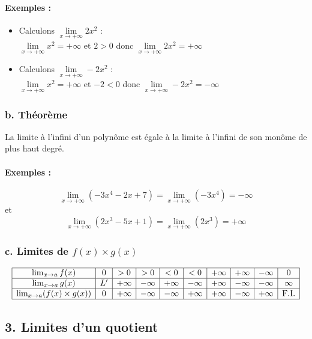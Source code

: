 \documentclass[12pt,a4paper]{article}
\begin{document}
\paragraph{Exemples :}
\begin{itemize}
    \item Calculons \( \lim\limits_{x \to +\infty} 2x^2\) : \\
    \(\lim\limits_{x \to +\infty} x^2 = +\infty\) et \(2 > 0\) donc 
$ \lim\limits_{x \to +\infty} 2x^2 = +\infty$

    \item Calculons \(\lim\limits_{x \to +\infty} -2x^2\) : \\
    \( \lim\limits_{x \to +\infty} x^2 = +\infty\) et \(-2 < 0\) donc 
$ \lim\limits_{x \to +\infty} -2x^2 = -\infty$
\end{itemize}

\subsubsection*{\color{myred}b. Théorème}

La limite à l'infini d'un polynôme est égale à la limite à l'infini de son monôme de plus haut degré.

\paragraph{Exemples :}
\[
\lim_{x \to +\infty} (-3x^4 - 2x + 7) = \lim_{x \to +\infty} (-3x^4) = -\infty
\]
et
\[
\lim_{x \to +\infty} (2x^3 - 5x + 1) = \lim_{x \to +\infty} (2x^3) = +\infty
\]

\subsubsection*{\color{myred}c. Limites de \( f(x) \times g(x) \)}

\[
\begin{array}{|c|c|c|c|c|c|c|c|c|c|}
\hline
\lim_{x \to a} f(x) & 0 & >0 & >0 & <0 & <0 & +\infty & +\infty & -\infty & 0 \\
\hline
\lim_{x \to a} g(x) & L' & +\infty & -\infty & +\infty & -\infty & +\infty & -\infty & -\infty & \infty \\
\hline
\lim_{x \to a} (f(x) \times g(x)) & 0 & +\infty & -\infty & -\infty & +\infty & +\infty & -\infty & +\infty & \text{F.I.} \\
\hline
\end{array}
\]

\subsection*{\color{myred}3. Limites d'un quotient}
\end{document}
